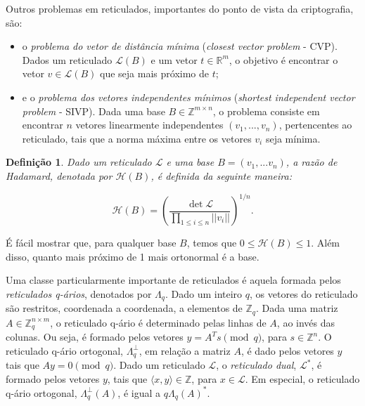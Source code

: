 \documentclass{SBCbookchapter}
\DeclareMathOperator{\Det}{det}
\newtheorem{definition}{Definição}{\bfseries}{\itshape}
\begin{document}
\begin{otherlanguage}{brazilian}

Outros problemas em reticulados, importantes do ponto de vista da criptografia, são:

\begin{itemize}
\item o \textit{problema do vetor de distância mínima} (\emph{closest vector problem} - CVP). Dados um reticulado $\mathcal{L}(B)$ e um vetor $t \in \mathbb{R}^m$, o objetivo é encontrar o vetor $v \in \mathcal{L}(B)$ que seja mais próximo de $t$;

\item e o \textit{problema dos vetores independentes mínimos} (\emph{shortest independent vector problem} - SIVP). Dada uma base $B \in \mathbb{Z}^{m \times n}$, o problema consiste em encontrar $n$ vetores linearmente independentes $(v_1, ..., v_n)$, pertencentes ao reticulado, tais que a norma máxima entre os vetores $v_i$ seja mínima.
\end{itemize}

\begin{definition}
Dado um reticulado $\mathcal{L}$ e uma base $B = (v_1, ...v_n)$, a \textit{razão de Hadamard}, denotada por $\mathcal{H}(B)$, é definida da seguinte maneira:

$$\mathcal{H}(B) = \left( \frac{\Det \mathcal{L}}{\prod_{1 \leq i \leq n} ||v_i|| } \right)^{1/n}.$$
\end{definition}

É fácil mostrar que, para qualquer base $B$, temos que $0 \leq \mathcal{H}(B) \leq 1$. Além disso, 
quanto mais próximo de 1 mais ortonormal é a base.

Uma classe particularmente importante de reticulados é aquela formada pelos \textit{reticulados q-ários}, denotados por $\Lambda_q$. Dado um inteiro $q$, os vetores do reticulado são restritos, coordenada a coordenada, a elementos de $\mathbb{Z}_q$. Dada uma matriz $A \in \mathbb{Z}_q^{n \times m}$, o reticulado q-ário é determinado pelas linhas de $A$, ao invés das colunas. Ou seja, é formado pelos vetores $y = A^Ts \pmod q$, para $s \in \mathbb{Z}^n$. O reticulado q-ário ortogonal, $\Lambda_q^\perp$, em relação a matriz $A$, é dado pelos vetores $y$ tais que $Ay=0 \pmod q$. Dado um reticulado $\mathcal{L}$, o \textit{reticulado dual}, $\mathcal{L}^*$, é formado pelos vetores $y$, tais que $\langle x,y \rangle \in \mathbb{Z}$, para $x \in \mathcal{L}$. Em especial, o reticulado q-ário ortogonal, $\Lambda_q^\perp(A)$, é igual a $q\Lambda_q(A)^*$.


\end{otherlanguage}
\end{document}
